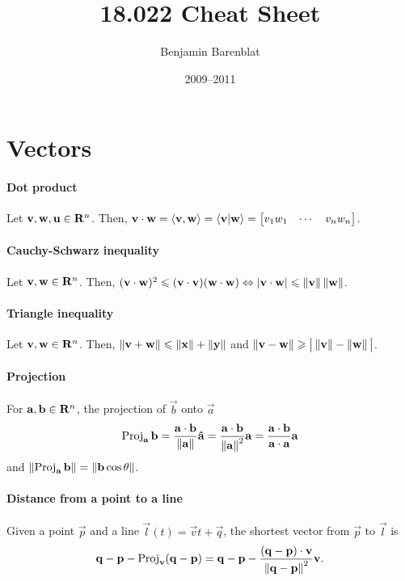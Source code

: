 \documentclass[10pt,landscape]{article}
\title{18.022 Cheat Sheet}
\author{Benjamin Barenblat}
\date{2009--2011}
\makeatletter
\renewcommand{\maketitle}{%
  \begin{center}
    \LARGE{\textbf{\@title}}
  \end{center}
}
\makeatother
\begin{document}
\raggedright
\begin{multicols*}{3}
\maketitle

\section{Vectors}
\paragraph{Dot product}
Let $\mathbf{v}, \mathbf{w}, \mathbf{u} \in \mathbf{R}^n$.
Then, $\mathbf{v} \cdot \mathbf{w} = \langle \mathbf{v}, \mathbf{w} \rangle = \langle\mathbf{v} \vert \mathbf{w}\rangle = \begin{bmatrix} v_1w_1 & \cdots & v_nw_n \end{bmatrix}$.

\paragraph{Cauchy-Schwarz inequality}
Let $\mathbf{v}, \mathbf{w} \in \mathbf{R}^n$.
Then, $(\mathbf{v} \cdot \mathbf{w})^2 \leqslant (\mathbf{v} \cdot \mathbf{v})(\mathbf{w} \cdot \mathbf{w}) \Leftrightarrow \left\lvert\mathbf{v} \cdot \mathbf{w}\right\rvert \leqslant \left\lVert\mathbf{v}\right\rVert\left\lVert\mathbf{w}\right\rVert$.

\paragraph{Triangle inequality}
Let $\mathbf{v}, \mathbf{w} \in \mathbf{R}^n$.
Then, $\left\lVert\mathbf{v} + \mathbf{w}\right\rVert \leqslant \left\lVert\mathbf{x}\right\rVert + \left\lVert\mathbf{y}\right\rVert$ and $\left\lVert\mathbf{v} - \mathbf{w}\right\rVert \geqslant \big\lvert\left\lVert\mathbf{v}\right\rVert - \left\lVert\mathbf{w}\right\rVert\big\rvert$.

\paragraph{Projection}
For $\mathbf{a}, \mathbf{b} \in \mathbf{R}^n$, the projection of $\vec b$ onto $\vec a$
\begin{equation}
  \label{eq:projection}
  \operatorname{Proj}_{\mathbf{a}}\mathbf{b} = \frac{\mathbf{a} \cdot \mathbf{b}}{\left\lVert\mathbf{a}\right\rVert}\mathbf{\hat a} = \frac{\mathbf{a} \cdot \mathbf{b}}{\left\lVert\mathbf{a}\right\rVert^2}\mathbf{a} = \frac{\mathbf{a} \cdot \mathbf{b}}{\mathbf{a} \cdot \mathbf{a}}\mathbf{a}
\end{equation}
and $\left\lVert\operatorname{Proj}_{\mathbf{a}}\mathbf{b}\right\rVert = \left\lVert\mathbf{b}\cos\theta\right\rVert$.

\paragraph{Distance from a point to a line}
Given a point $\vec p$ and a line $\vec l(t) = \vec vt + \vec q$, the shortest vector from $\vec p$ to $\vec l$ is
\begin{equation}
  \mathbf{q} - \mathbf{p} - \operatorname{Proj}_{\mathbf{v}}(\mathbf{q} - \mathbf{p}) = \mathbf{q} - \mathbf{p} - \frac{(\mathbf{q} - \mathbf{p}) \cdot \mathbf{v}}{\left\lVert\mathbf{q} - \mathbf{p}\right\rVert^2}\mathbf{v}.
\end{equation}


\end{multicols*}
\end{document}
